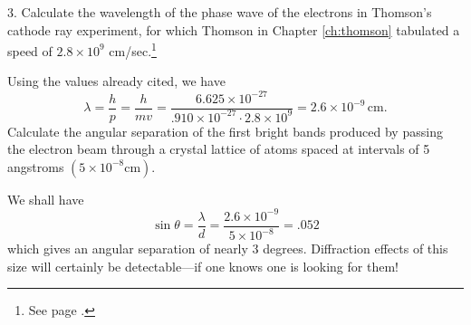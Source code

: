 3. Calculate the wavelength of the phase wave of the electrons in
Thomson's cathode ray experiment, for which Thomson in Chapter \ref{ch:thomson}
tabulated a speed of $2.8\times 10^{9}$ cm/sec.\footnote{See page \pageref{tbl:thomson_air}.}

Using the values already cited, we have
\begin{equation*}
\lambda = \frac{h}{p} = \frac{h}{mv} = 
\frac{6.625\times 10^{-27}}{.910\times 10^{-27}\cdot2.8\times 10^9}
=2.6\times 10^{-9}\, \text{cm}.
\end{equation*}
Calculate the angular separation of the first bright bands produced by
passing the electron beam through a crystal lattice of atoms spaced at
intervals of 5 angstroms $(5\times 10^{-8} \text{cm})$.

We shall have
\begin{equation*}
\sin{\theta}=\frac{\lambda}{d}=\frac{2.6\times 10^{-9}}{5\times 10^{-8}}
= .052
\end{equation*}
which gives an angular separation of nearly $3$ degrees. Diffraction
effects of this size will certainly be detectable---if one knows one is
looking for them!
